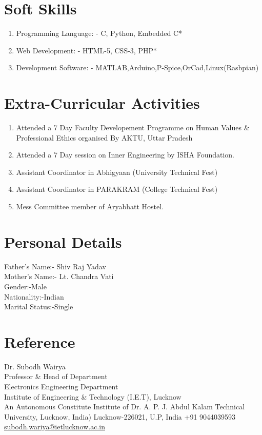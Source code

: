 \documentclass[12pt]{article}
\begin{document}
\section*{Soft Skills}
\begin{enumerate}

  \item Programming Language: - C, Python, Embedded C*
  \item Web Development: - HTML-5, CSS-3, PHP*
  \item Development Software: - MATLAB,Arduino,P-Spice,OrCad,Linux(Rasbpian)
  \end{enumerate}
  
\section*{Extra-Curricular Activities}
\begin{enumerate}
\item Attended a 7 Day Faculty Developement Programme on Human Values \& Professional Ethics organised By
AKTU, Uttar Pradesh
\item Attended a 7 Day session on Inner Engineering by ISHA Foundation.
\item Assistant Coordinator in Abhigyaan (University Technical Fest)
\item Assistant Coordinator in PARAKRAM (College Technical Fest)
\item Mess Committee member of Aryabhatt Hostel.
\end{enumerate}



\section*{Personal Details}
{\large {Father's Name:- \hspace{1.1cm} Shiv Raj Yadav\\
Mother's Name:- \hspace{1cm} Lt. Chandra Vati\\
Gender:-\hspace{2.9cm}Male\\
Nationality:-\hspace{2.0cm}Indian\\
Marital Status:-\hspace{1.4cm}Single\\
}}
\section*{\large {Reference}}
Dr. Subodh Wairya\\
Professor \& Head of Department\\
Electronics Engineering Department\\
Institute of Engineering \& Technology (I.E.T), Lucknow\\
An Autonomous Constitute Institute of Dr. A. P. J. Abdul Kalam Technical University, Lucknow, India)
Lucknow-226021, U.P, India
+91 9044039593\\
\href{subodh.wariya@ietlucknow.ac.in}{subodh.wariya@ietlucknow.ac.in}
\end{document}
